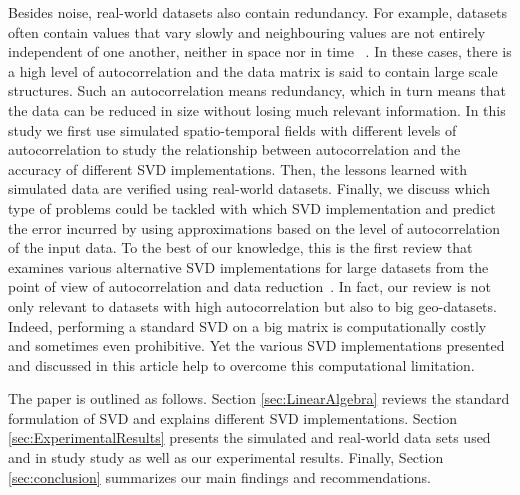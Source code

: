 \documentclass[ijgi,article,submit,moreauthors,pdftex,10pt,a4paper]{Definitions/mdpi}
\begin{document}
Besides noise, real-world datasets also contain redundancy. For example, datasets often contain values that vary slowly and neighbouring values are not entirely independent of one another, neither in space nor in time ~\cite{Eshel2011}. In these cases, there is a high level of autocorrelation and the data matrix is said to contain large scale structures. Such an autocorrelation means redundancy, which in turn means that the data can be reduced in size without losing much relevant information. In this study we first use simulated spatio-temporal fields with different levels of autocorrelation to study the relationship between autocorrelation and the accuracy of different SVD implementations. Then, the lessons learned with simulated data are verified using real-world datasets. Finally, we discuss which type of problems could be tackled with which SVD implementation and predict the error incurred by using approximations based on the level of autocorrelation of the input data. To the best of our knowledge, this is the first review that examines various alternative SVD implementations for large datasets from the point of view of autocorrelation and data reduction~\cite{Golub1970, Bjorck1973, Chan1982}. %
In fact, our review is not only relevant to datasets with high autocorrelation but also to big geo-datasets. Indeed, performing a standard SVD on a big matrix is computationally costly and sometimes even prohibitive. Yet the various SVD implementations presented and discussed in this article help to overcome this computational limitation. 

The paper is outlined as follows. Section \ref{sec:LinearAlgebra} reviews the standard formulation of SVD and explains different SVD implementations. Section \ref{sec:ExperimentalResults} presents the simulated and real-world data sets used and in study study as well as our experimental results. Finally, Section \ref{sec:conclusion} summarizes our main findings and recommendations.

\end{document}
